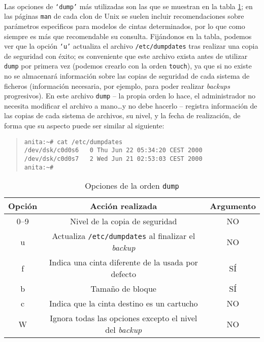 \\Las opciones de {\tt `dump'} m\'as utilizadas son las que se muestran en la
tabla \ref{dumpops}; en las p\'aginas {\tt man} de cada clon de Unix se suelen
incluir recomendaciones sobre par\'ametros espec\'{\i}ficos para modelos de
cintas determinados, por lo que como siempre es m\'as que recomendable su
consulta. Fij\'andonos en la tabla, podemos ver que la opci\'on {\tt `u'}
actualiza el archivo {\tt /etc/dumpdates} tras realizar una copia de seguridad
con \'exito; es conveniente que este archivo exista antes de utilizar {\tt dump}
por primera vez (podemos crearlo con la orden {\tt touch}), ya que si no existe
no se almacenar\'a informaci\'on sobre las copias de seguridad de cada sistema
de ficheros (informaci\'on necesaria, por ejemplo, para poder realizar {\it
backups} progresivos). En este archivo {\tt dump} -- la propia orden lo hace,
el administrador no necesita modificar el archivo a mano\ldots y no debe 
hacerlo -- registra informaci\'on de las copias de cada sistema de archivos, su 
nivel, y la fecha de realizaci\'on, de forma que su aspecto puede ser similar 
al siguiente:
\begin{quote}
\begin{verbatim}
anita:~# cat /etc/dumpdates
/dev/dsk/c0d0s6   0 Thu Jun 22 05:34:20 CEST 2000
/dev/dsk/c0d0s7   2 Wed Jun 21 02:53:03 CEST 2000
anita:~#
\end{verbatim}
\end{quote}
\begin{table}
\begin{center}
\begin{tabular}{|c|c|c|}
\hline
Opci\'on & Acci\'on realizada & Argumento\\
\hline\hline
0--9 & Nivel de la copia de seguridad & NO\\
\hline
u & Actualiza {\tt /etc/dumpdates} al finalizar el {\it backup} & NO\\
\hline
f & Indica una cinta diferente de la usada por defecto & S\'I\\
\hline
b & Tama\~no de bloque & S\'I\\
\hline
c & Indica que la cinta destino es un cartucho & NO\\
\hline
W & Ignora todas las opciones excepto el nivel del {\it backup} & NO\\
\hline
\end{tabular}
\caption{Opciones de la orden {\tt dump}}
\label{dumpops}
\end{center}
\end{table}
